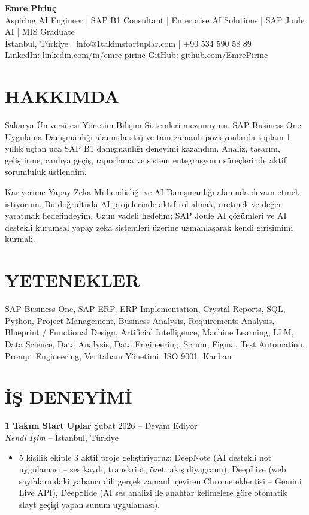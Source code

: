 \documentclass[a4paper,8pt]{article}
\begin{document}
\begin{center}
{\Large\bfseries Emre Pirinç}\\[2pt]
{\small Aspiring AI Engineer | SAP B1 Consultant | Enterprise AI Solutions | SAP Joule AI | MIS Graduate}\\[2pt]
{\small İstanbul, Türkiye | info@1takimstartuplar.com | +90 534 590 58 89}\\[1pt]
{\small LinkedIn: \href{https://linkedin.com/in/emre-pirinc}{linkedin.com/in/emre-pirinc} \textbar{} GitHub: \href{https://github.com/EmrePirinc}{github.com/EmrePirinc}}
\end{center}

\vspace{-2pt}

\section{HAKKIMDA}
{\small Sakarya Üniversitesi Yönetim Bilişim Sistemleri mezunuyum. SAP Business One Uygulama Danışmanlığı alanında staj ve tam zamanlı pozisyonlarda toplam 1 yıllık uçtan uca SAP B1 danışmanlığı deneyimi kazandım. Analiz, tasarım, geliştirme, canlıya geçiş, raporlama ve sistem entegrasyonu süreçlerinde aktif sorumluluk üstlendim.

Kariyerime Yapay Zeka Mühendisliği ve AI Danışmanlığı alanında devam etmek istiyorum. Bu doğrultuda AI projelerinde aktif rol almak, üretmek ve değer yaratmak hedefindeyim. Uzun vadeli hedefim; SAP Joule AI çözümleri ve AI destekli kurumsal yapay zeka sistemleri üzerine uzmanlaşarak kendi girişimimi kurmak.}

\section{YETENEKLER}
{\small SAP Business One, SAP ERP, ERP Implementation, Crystal Reports, SQL, Python, Project Management, Business Analysis, Requirements Analysis, Blueprint / Functional Design, Artificial Intelligence, Machine Learning, LLM, Data Science, Data Analysis, Data Engineering, Scrum, Figma, Test Automation, Prompt Engineering, Veritabanı Yönetimi, ISO 9001, Kanban}

\section{İŞ DENEYİMİ}

\textbf{1 Takım Start Uplar} \hfill {\small Şubat 2026 -- Devam Ediyor}\\
{\small \textit{Kendi İşim} -- İstanbul, Türkiye}
\begin{itemize}
\item {\small 5 kişilik ekiple 3 aktif proje geliştiriyoruz: DeepNote (AI destekli not uygulaması -- ses kaydı, transkript, özet, akış diyagramı), DeepLive (web sayfalarındaki yabancı dili gerçek zamanlı çeviren Chrome eklentisi -- Gemini Live API), DeepSlide (AI ses analizi ile anahtar kelimelere göre otomatik slayt geçişi yapan sunum uygulaması).}
\end{itemize}
\end{document}
